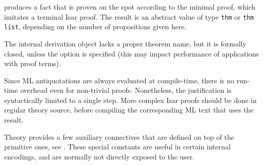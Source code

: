 \begin{isabellebody}
\begin{isamarkuptext}
\begin{description}
  \item {} produces a fact that is proven on
  the spot according to the minimal proof, which imitates a terminal
  Isar proof.  The result is an abstract value of type \verb|thm|
  or \verb|thm list|, depending on the number of propositions
  given here.

  The internal derivation object lacks a proper theorem name, but it
  is formally closed, unless the  option is specified
  (this may impact performance of applications with proof terms).

  Since ML antiquotations are always evaluated at compile-time, there
  is no run-time overhead even for non-trivial proofs.  Nonetheless,
  the justification is syntactically limited to a single \hyperlink{command.by}{\mbox{}} step.  More complex Isar proofs should be done in regular
  theory source, before compiling the corresponding ML text that uses
  the result.

  \end{description}%
\end{isamarkuptext}%
\isamarkuptrue%
%
\endisatagmlantiq
{\isafoldmlantiq}%
%
\isadelimmlantiq
%
\endisadelimmlantiq
%
\isamarkuptrue%
%
\begin{isamarkuptext}%
Theory  provides a few auxiliary connectives
  that are defined on top of the primitive ones, see
  .  These special constants are useful in
  certain internal encodings, and are normally not directly exposed to
  the user.


\end{isamarkuptext}
\end{isabellebody}
